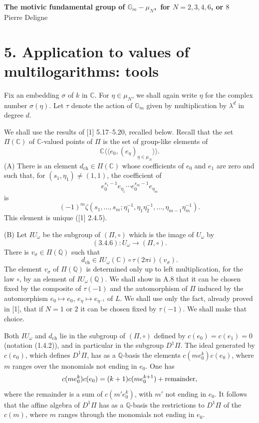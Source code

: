 \documentclass[10pt,a4paper]{article}
\newcommand{\Gm}{\mathbb G_m}
\newcommand{\Q}{\mathbb Q}
\newcommand{\C}{\mathbb C}
\theoremstyle{deligne}
\newcommand{\heading}[1]{\vspace{0.65em}\noindent{\bfseries #1}\quad}
\begin{document}
\begin{center}
{\Large\bfseries The motivic fundamental group of \(\Gm-\mu_N\),\ for \(N=2,3,4,6\), or \(8\)}\\[0.4em]
{\large Pierre Deligne}
\end{center}

\section*{5. Application to values of multilogarithms: tools}

Fix an embedding \(\sigma\) of \(k\) in \(\C\). For \(\eta\in\mu_N\), we shall again write \(\eta\) for the complex number \(\sigma(\eta)\). Let \(\tau\) denote the action of \(\Gm\) given by multiplication by \(\lambda^d\) in degree \(d\).

\heading{5.1.} We shall use the results of [1] 5.17--5.20, recalled below. Recall that the set \(\Pi(\C)\) of \(\C\)-valued points of \(\Pi\) is the set of group-like elements of
\[
 \C\langle\!\langle e_0,(e_\eta)_{\eta\in\mu_N}\rangle\!\rangle .
\]
(A) There is an element \(d_{\mathrm{ch}}\in\Pi(\C)\) whose coefficients of \(e_0\) and \(e_1\) are zero and such that, for \((s_1,\eta_1)\ne(1,1)\), the coefficient of
\[
 e_0^{s_1-1}e_{\eta_1}\cdots e_0^{s_m-1}e_{\eta_m}
\]
is
\[
 (-1)^m\zeta(s_1,\ldots,s_m;\eta_1^{-1},\eta_1\eta_2^{-1},\ldots,\eta_{m-1}\eta_m^{-1}).
\]
This element is unique ([1] 2.4.5).

(B) Let \(IU_\omega\) be the subgroup of \((\Pi,\circ)\) which is the image of \(U_\omega\) by
\[
(3.4.6):U_\omega\longrightarrow(\Pi,\circ).
\]
There is \(v_\sigma\in\Pi(\Q)\) such that
\[
\tag{5.1.1}
d_{\mathrm{ch}}\in IU_\omega(\C)\circ \tau(2\pi i)(v_\sigma).
\]
The element \(v_\sigma\) of \(\Pi(\Q)\) is determined only up to left multiplication, for the law \(\circ\), by an element of \(IU_\omega(\Q)\). We shall show in A.8 that it can be chosen fixed by the composite of \(\tau(-1)\) and the automorphism of \(\Pi\) induced by the automorphism \(e_0\mapsto e_0\), \(e_\eta\mapsto e_{\eta^{-1}}\) of \(L\). We shall use only the fact, already proved in [1], that if \(N=1\) or \(2\) it can be chosen fixed by \(\tau(-1)\). We shall make that choice.

\heading{5.2.} Both \(IU_\omega\) and \(d_{\mathrm{ch}}\) lie in the subgroup of \((\Pi,\circ)\) defined by \(c(e_0)=c(e_1)=0\) (notation (1.4.2)), and in particular in the subgroup \(D^1\Pi\). The ideal generated by \(c(e_0)\), which defines \(D^1\Pi\), has as a \(\Q\)-basis the elements \(c(me_0^k)c(e_0)\), where \(m\) ranges over the monomials not ending in \(e_0\). One has
\[
c(me_0^k)c(e_0)=(k+1)c(me_0^{k+1})+\hbox{remainder},
\]
where the remainder is a sum of \(c(m'e_0^k)\), with \(m'\) not ending in \(e_0\). It follows that the affine algebra of \(D^1\Pi\) has as a \(\Q\)-basis the restrictions to \(D^1\Pi\) of the \(c(m)\), where \(m\) ranges through the monomials not ending in \(e_0\).
\end{document}
